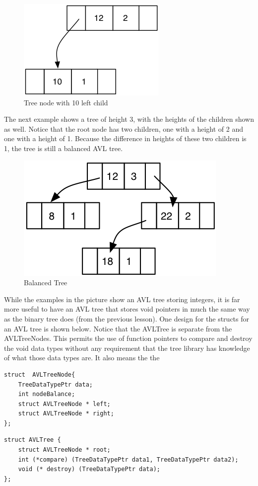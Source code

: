 \begin{figure}[H]
\centering
\includegraphics{pictures/tree13.png}
\caption{Tree node with 10 left child}
\label{fig:tree13}
\end{figure}

The next example shows a tree of height 3, with the heights of the children shown as well. Notice that the root node has two children, one with a height of 2 and one with a height of 1. Because the difference in heights of these two children is 1, the tree is still a balanced AVL tree.

\begin{figure}[H]
\centering
\includegraphics{pictures/tree14.png}
\caption{Balanced Tree}
\label{fig:tree14}
\end{figure}

While the examples in the picture show an AVL tree storing integers, it is far more useful to have an AVL tree that stores void pointers in much the same way as the binary tree does (from the previous lesson). One design for the structs for an AVL tree is shown below. Notice that the AVLTree is separate from the AVLTreeNodes. This permits the use of function pointers to compare and destroy the void data types without any requirement that the tree library has knowledge of what those data types are. It also means the the
\begin{verbatim}
struct  AVLTreeNode{
    TreeDataTypePtr data;
    int nodeBalance;
    struct AVLTreeNode * left;
    struct AVLTreeNode * right;
};\end{verbatim}
\begin{verbatim}
struct AVLTree {
    struct AVLTreeNode * root;
    int (*compare) (TreeDataTypePtr data1, TreeDataTypePtr data2);
    void (* destroy) (TreeDataTypePtr data);
};\end{verbatim}

